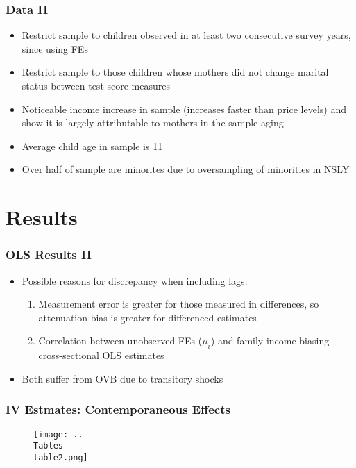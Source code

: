\documentclass{beamer}
\begin{document}
\begin{frame}
\frametitle{Data II}
\begin{itemize}
	\item Restrict sample to children observed in at least two consecutive survey years, since using FEs
	\item Restrict sample to those children whose mothers did not change marital status between test score measures
	\item Noticeable income increase in sample (increases faster than price levels) and show it is largely attributable to mothers in the sample aging
	\item Average child age in sample is 11
	\item Over half of sample are minorites due to oversampling of minorities in NSLY
\end{itemize}
\end{frame}


\section{Results}

\iffalse
\begin{frame}
\frametitle{OLS Results I}
	\begin{figure}
		\texttt{[image: ..\\Tables\\table1.png]} %
	\end{figure}
\end{frame}
\fi

\begin{frame}
\frametitle{OLS Results II}
	\begin{itemize}
		\item Possible reasons for discrepancy when including lags:
		\begin{enumerate}[(1)]
			\item Measurement error is greater for those measured in differences, so attenuation bias is greater for differenced estimates
			\item Correlation between unobserved FEs ($\mu_i$) and family income biasing cross-sectional OLS estimates 
		\end{enumerate}
		\item Both suffer from OVB due to transitory shocks
	\end{itemize}
\end{frame}

\begin{frame}
\frametitle{IV Estmates: Contemporaneous Effects}
	\begin{figure}
		\texttt{[image: ..\\Tables\\table2.png]}
	\end{figure}
\end{frame}
\end{document}
